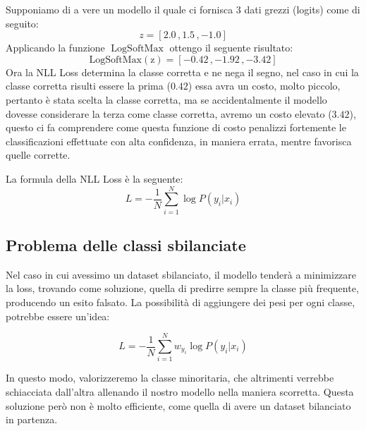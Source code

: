 \begin{Esempio}
    Supponiamo di a vere un modello il quale ci fornisca 3 dati grezzi (logits) come di seguito:
    \begin{equation}
        z=[2.0\,,1.5\,,-1.0]
    \end{equation}
    Applicando la funzione $\operatorname{LogSoftMax}$ ottengo il seguente risultato:
    \begin{equation}
        \operatorname{LogSoftMax(z)} = [-0.42\,,-1.92\,,-3.42]
    \end{equation}
    Ora la NLL Loss determina la classe corretta e ne nega il segno, nel caso in cui la classe corretta risulti essere la prima ($0.42$) essa avra un costo, molto piccolo, pertanto è stata scelta la classe corretta, ma se accidentalmente il modello dovesse considerare la terza come classe corretta, avremo un costo elevato ($3.42$), questo ci fa comprendere come questa funzione di costo penalizzi fortemente le classificazioni effettuate con alta confidenza, in maniera errata, mentre favorisca quelle corrette.
\end{Esempio}
La formula della NLL Loss è la seguente:
\begin{equation}
    L = -\frac{1}{N}\sum^{N}_{i=1}\log P(y_i|x_i)
\end{equation}

\subsection{Problema delle classi sbilanciate}
Nel caso in cui avessimo un dataset sbilanciato, il modello tenderà a minimizzare la loss, trovando come soluzione, quella di predirre sempre la classe più frequente, producendo un esito falsato. La possibilità di aggiungere dei pesi per ogni classe, potrebbe essere un'idea:

\begin{equation}
    L = -\frac{1}{N}\sum^{N}_{i=1}w_{y_i}\log P(y_i|x_i)
\end{equation}

In questo modo, valorizzeremo la classe minoritaria, che altrimenti verrebbe schiacciata dall'altra allenando il nostro modello nella maniera scorretta. Questa soluzione però non è molto efficiente, come quella di avere un dataset bilanciato in partenza.

